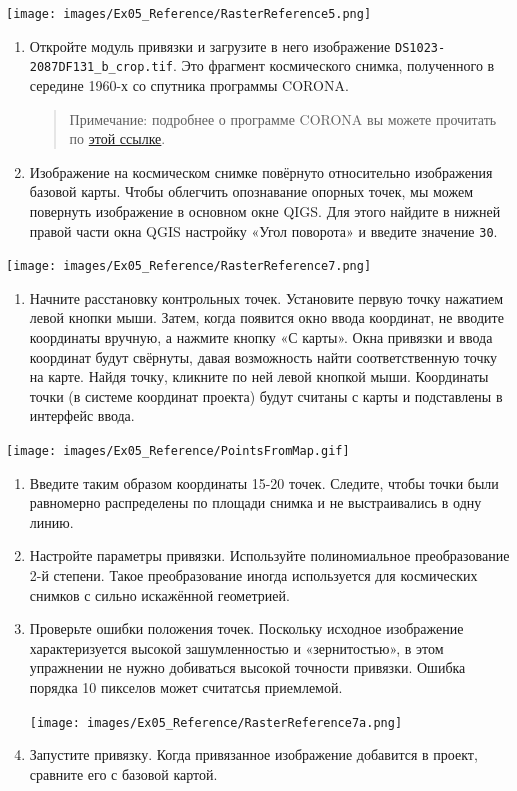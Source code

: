 \documentclass[
  12pt,
]{book}
\providecommand{\tightlist}{%
  \setlength{\itemsep}{0pt}\setlength{\parskip}{0pt}}
\begin{document}
\texttt{[image: images/Ex05\_Reference/RasterReference5.png]}

\begin{enumerate}
\def\labelenumi{\arabic{enumi}.}
\setcounter{enumi}{2}
\item
  Откройте модуль привязки и загрузите в него изображение \texttt{DS1023-2087DF131\_b\_crop.tif}. Это фрагмент космического снимка, полученного в середине 1960-х со спутника программы CORONA.

  \begin{quote}
  Примечание: подробнее о программе CORONA вы можете прочитать по \href{https://www.usgs.gov/centers/eros/science/usgs-eros-archive-declassified-data-declassified-satellite-imagery-1}{этой ссылке}.
  \end{quote}
\item
  Изображение на космическом снимке повёрнуто относительно изображения базовой карты. Чтобы облегчить опознавание опорных точек, мы можем повернуть изображение в основном окне QIGS. Для этого найдите в нижней правой части окна QGIS настройку «Угол поворота» и введите значение \texttt{30}.
\end{enumerate}

\texttt{[image: images/Ex05\_Reference/RasterReference7.png]}

\begin{enumerate}
\def\labelenumi{\arabic{enumi}.}
\setcounter{enumi}{5}
\tightlist
\item
  Начните расстановку контрольных точек. Установите первую точку нажатием левой кнопки мыши. Затем, когда появится окно ввода координат, не вводите координаты вручную, а нажмите кнопку «С карты». Окна привязки и ввода координат будут свёрнуты, давая возможность найти соответственную точку на карте. Найдя точку, кликните по ней левой кнопкой мыши. Координаты точки (в системе координат проекта) будут считаны с карты и подставлены в интерфейс ввода.
\end{enumerate}

\texttt{[image: images/Ex05\_Reference/PointsFromMap.gif]}

\begin{enumerate}
\def\labelenumi{\arabic{enumi}.}
\setcounter{enumi}{6}
\item
  Введите таким образом координаты 15-20 точек. Следите, чтобы точки были равномерно распределены по площади снимка и не выстраивались в одну линию.
\item
  Настройте параметры привязки. Используйте полиномиальное преобразование 2-й степени. Такое преобразование иногда используется для космических снимков с сильно искажённой геометрией.
\item
  Проверьте ошибки положения точек. Поскольку исходное изображение характеризуется высокой зашумленностью и «зернитостью», в этом упражнении не нужно добиваться высокой точности привязки. Ошибка порядка 10 пикселов может считатсья приемлемой.

  \texttt{[image: images/Ex05\_Reference/RasterReference7a.png]}
\item
  Запустите привязку. Когда привязанное изображение добавится в проект, сравните его с базовой картой.
\end{enumerate}
\end{document}
